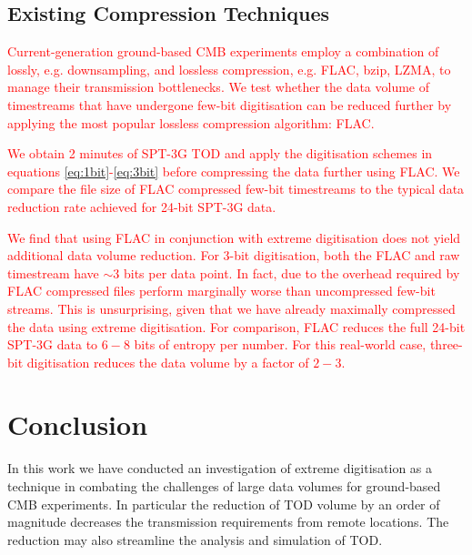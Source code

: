 \documentclass[apj]{emulateapj}
\newcommand{\changed}[1]{\textcolor{Red}{#1}}
\begin{document}

\subsection{Existing Compression Techniques}

\changed{Current-generation ground-based CMB experiments employ a combination of lossly, e.g. downsampling, and lossless compression, e.g. FLAC, bzip, LZMA, to manage their transmission bottlenecks. We test whether the data volume of timestreams that have undergone few-bit digitisation can be reduced further by applying the most popular lossless compression algorithm: FLAC. }

\changed{We obtain 2 minutes of SPT-3G TOD and apply the digitisation schemes in equations \ref{eq:1bit}-\ref{eq:3bit} before compressing the data further using FLAC. We compare the file size of FLAC compressed few-bit timestreams to the typical data reduction rate achieved for 24-bit SPT-3G data.}

\changed{We find that using FLAC in conjunction with extreme digitisation does not yield additional data volume reduction. For 3-bit digitisation, both the FLAC and raw timestream have $\sim$3 bits per data point. In fact, due to the overhead required by FLAC compressed files perform marginally worse than uncompressed few-bit streams. This is unsurprising, given that we have already maximally compressed the data using extreme digitisation. For comparison, FLAC reduces the full 24-bit  SPT-3G data to $6-8$ bits of entropy per number. For this real-world case, three-bit digitisation reduces the data volume by a factor of $2-3$.}

\section{Conclusion}
\label{sec:conclusions}

In this work we have conducted an investigation of extreme digitisation as a technique in combating the challenges of large data volumes for ground-based CMB experiments. In particular the reduction of TOD volume by an order of magnitude decreases the transmission requirements from remote locations. The reduction may also streamline the analysis and simulation of TOD.
\end{document}
